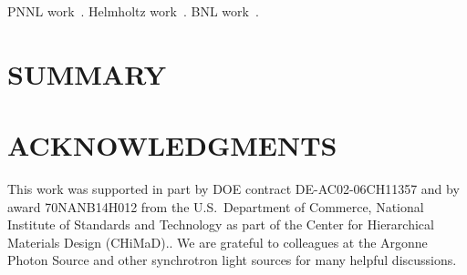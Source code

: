\documentclass{aip-cp}
\begin{document}
PNNL work~\cite{thomas2015towards}. Helmholtz work~\cite{gehrke2015high}. BNL work~\cite{deslippe2014workflow}.


\section{SUMMARY}









\section{ACKNOWLEDGMENTS}

This work was supported in part by DOE contract DE-AC02-06CH11357 and by award 70NANB14H012 from the U.S.\  Department of Commerce, National Institute of Standards and Technology as part of the Center for Hierarchical Materials Design (CHiMaD)..
We are grateful to colleagues at the Argonne Photon Source and other synchrotron light sources
for many helpful discussions.


\nocite{*}
%
%
\end{document}
